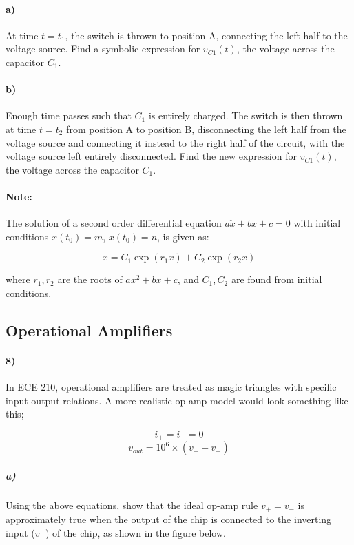 \documentclass{article}
\begin{document}
\paragraph{a)} At time $t = t_1$, the switch is thrown to position A, connecting the left half to the voltage source. Find a symbolic expression for $v_{C1}(t)$, the voltage across the capacitor $C_1$.

\paragraph{b)} Enough time passes such that $C_1$ is entirely charged. The switch is then thrown at time $t = t_2$ from position A to position B, disconnecting the left half from the voltage source and connecting it instead to the right half of the circuit, with the voltage source left entirely disconnected. Find the new expression for $v_{C1}(t)$, the voltage across the capacitor $C_1$.

\paragraph{Note:} The solution of a second order differential equation $a\ddot{x} + b\dot{x} + c = 0$ with initial conditions $x(t_0) = m$, $\dot{x}(t_0) = n$, is given as:

\[
x = C_1\exp(r_1x) + C_2\exp(r_2x)
\]

where $r_1, r_2$ are the roots of $ax^2 + bx + c$, and $C_1, C_2$ are found from initial conditions.

\vfill
\newpage

\subsection*{Operational Amplifiers}

\paragraph{8)} In ECE 210, operational amplifiers are treated as magic triangles with specific input output relations. A more realistic op-amp model would look something like this;

\[
i_+ = i_- = 0
\]
\[
v_{out} = 10^6\times(v_+ - v_-)
\]

\subparagraph{a)} Using the above equations, show that the ideal op-amp rule $v_+ = v_-$ is approximately true when the output of the chip is connected to the inverting input ($v_-$) of the chip, as shown in the figure below. 
\end{document}

